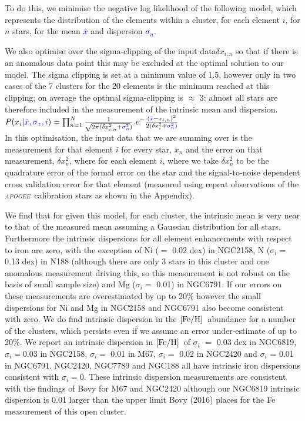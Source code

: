 \documentclass[14pt, preprint2]{aastex6}
\newcommand{\project}[1]{\textsl{#1}}
\newcommand{\apogee}{\project{\textsc{apogee}}}
\newcommand{\feh}{\mbox{$\rm [Fe/H]$}}
\begin{document}
To do this, we minimise the negative log likelihood of the following model, which represents the distribution of the elements within a cluster, for each element $i$, for $n$ stars, for the mean \textcolor{blue}{$\bar{x}$} and dispersion \textcolor{blue}{$\sigma_n$}. 

We also optimise over the sigma-clipping of the input data$ \delta x_{i, n}$ so that if there is an anomalous data point this may be excluded at the optimal solution to our model.  The sigma clipping is set at a minimum value of 1.5, however only in two cases of the 7 clusters for the 20 elements is the minimum reached at this clipping; on average the optimal sigma-clipping is $\approx$ 3: almost all stars are therefore included in the measurement of the intrinsic mean and dispersion.\\

$P({x_i} | \textcolor{blue}{\bar{x}, \sigma_x, i }) =  \prod_{n=1}^{N} \frac{1}{\sqrt{2 \pi (\delta x_{ \textcolor{blue}{i}, n} ^2 + \textcolor{blue}{{\sigma}_n^2}})} . e ^ - {\frac{\textcolor{blue}{(\bar{x}} - x_{\textcolor{blue}{i}, n})^2 }{2(\delta x_i^2 + \textcolor{blue}{\sigma_n^2)}}}$ \\

In this optimisation, the input data that we are summing over is the measurement for that element $i$ for every star, $x_n$  and the error on that measurement, $\delta x_n^2$, where for each element $i$, where we take $\delta x_n^2$ to be the quadrature error of the formal error on the star and the signal-to-noise dependent cross validation error for that element (measured using repeat observations of the \apogee\ calibration stars as shown in the Appendix). 

We find that for given this model, for each cluster, the intrinsic mean is very near to that of the measured mean assuming a Gaussian distribution for all stars. Furthermore the intrinsic dispersions for all element enhancements with respect to iron are zero, with the exception of Ni ($=$ 0.02 dex) in NGC2158, N ($\sigma_i$$=$ 0.13 dex) in N188 (although there are only 3 stars in this cluster and one anomalous measurement driving this, so this measurement is not robust on the basis of small sample size) and Mg ($\sigma_i$$=$ 0.01) in NGC6791. If our errors on these measurements are overestimated by up to 20\% however the small dispersions for Ni and Mg in NGC2158 and NGC6791 also become consistent with zero. We do find intrinsic dispersion in the \feh\ abundance for a number of the clusters, which persists even if we assume an error under-estimate of up to 20\%. We report an intrinsic dispersion in \feh\ of $\sigma_i$ $=$ 0.03 dex in NGC6819, $\sigma_i$$=$0.03 in NGC2158, $\sigma_i$$=$ 0.01 in M67,  $\sigma_i$$=$ 0.02 in NGC2420 and $\sigma_i$ = 0.01 in NGC6791. NGC2420, NGC7789 and NGC188 all have intrinsic iron dispersions consistent with  $\sigma_i$$=$0. These intrinsic dispersion measurements are consistent with the findings of Bovy for M67 and NGC2420 although our NGC6819 intrinsic dispersion is 0.01 larger than the upper limit Bovy (2016) places for the Fe measurement of this open cluster. 
\end{document}
